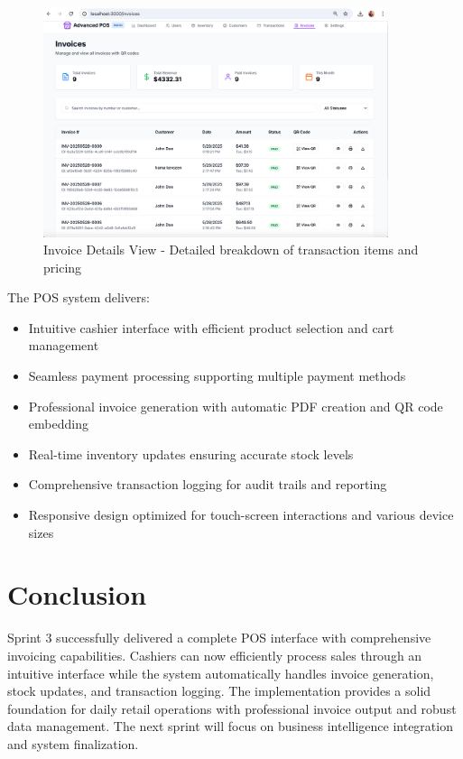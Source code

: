 \begin{figure}[H]
  \centering
  \includegraphics[width=0.9\textwidth]{working app screenshots/invoicedetails.png}
  \caption{Invoice Details View - Detailed breakdown of transaction items and pricing}
  \label{fig:invoicedetails}
\end{figure}

The POS system delivers:

\begin{itemize}
  \item Intuitive cashier interface with efficient product selection and cart management
  \item Seamless payment processing supporting multiple payment methods
  \item Professional invoice generation with automatic PDF creation and QR code embedding
  \item Real-time inventory updates ensuring accurate stock levels
  \item Comprehensive transaction logging for audit trails and reporting
  \item Responsive design optimized for touch-screen interactions and various device sizes
\end{itemize}

\section{Conclusion}

Sprint 3 successfully delivered a complete POS interface with comprehensive invoicing capabilities. Cashiers can now efficiently process sales through an intuitive interface while the system automatically handles invoice generation, stock updates, and transaction logging. The implementation provides a solid foundation for daily retail operations with professional invoice output and robust data management. The next sprint will focus on business intelligence integration and system finalization.
